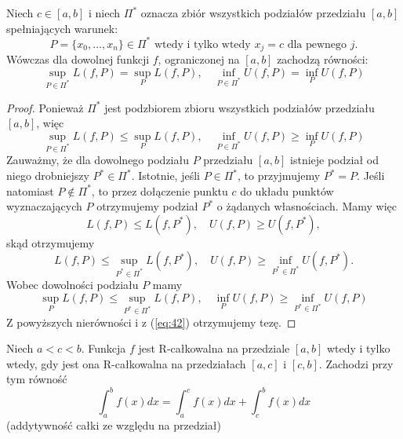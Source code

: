 \documentclass[leqno]{article}
\begin{document}
\begin{justify}
\begin{lemat}
{
    Niech $c \in [a,b]$ i niech $\Pi^*$ oznacza zbiór wszystkich podziałów przedziału $[a,b]$ spełniających warunek:
    \[
        P = \{x_0, \ldots, x_n\} \in \Pi^* \text{ wtedy i tylko wtedy $x_j = c$ dla pewnego $j$.} 
    \]
    Wówczas dla dowolnej funkcji $f$, ograniczonej na $[a,b]$ zachodzą równości:
    \[
        \sup_{P \in \Pi^*}L(f, P) = \sup_{P}L(f, P), \quad  \inf_{P \in \Pi^*}U(f, P) = \inf_{P}U(f, P)
    \]
}
\end{lemat}
\begin{proof}
    Ponieważ $\Pi^*$ jest podzbiorem zbioru wszystkich podziałów przedziału $[a,b]$, więc
    \begin{equation}\label{eq:42}
        \sup_{P \in \Pi^*}L(f, P) \leqslant \sup_{P}L(f, P), \quad  \inf_{P \in \Pi^*}U(f, P) \geqslant \inf_{P}U(f, P)
    \end{equation}
    Zauważmy, że dla dowolnego podziału $P$ przedziału $[a,b]$ istnieje podział od niego drobniejszy
    $P^* \in \Pi^*$. Istotnie, jeśli $P \in \Pi^*$, to przyjmujemy $P^* = P$. Jeśli natomiast $P \notin \Pi^*$,
    to przez dołączenie punktu $c$ do układu punktów wyznaczających $P$ otrzymujemy podział $P^*$ o żądanych własnościach.
    Mamy więc
    \[
        L(f, P) \leqslant L(f, P^*), \quad U(f, P) \geqslant U(f, P^*),
    \]
    skąd otrzymujemy
    \[
        L(f, P) \leqslant \sup_{P^* \in \Pi^*}L(f, P^*), \quad U(f, P) \geqslant \inf_{P^* \in \Pi^*}U(f, P^*).
    \]
    Wobec dowolności podziału $P$ mamy
    \[
        \sup_{P}L(f, P) \leqslant \sup_{P^* \in \Pi^*}L(f, P), \quad  \inf_{P}U(f, P) \geqslant \inf_{P^* \in \Pi^*}U(f, P)
    \]
    Z powyższych nierówności i z (\ref{eq:42}) otrzymujemy tezę.
\end{proof}

\begin{theorem}
{
    Niech $a < c < b$. Funkcja $f$ jest R-całkowalna na przedziale $[a,b]$ wtedy i tylko wtedy, gdy
    jest ona R-całkowalna na przedziałach $[a,c]$ i $[c,b]$. Zachodzi przy tym równość
    \[
        \int_{a}^{b}f(x)dx = \int_{a}^{c}f(x)dx + \int_{c}^{b}f(x)dx
    \]
    (addytywność całki ze względu na przedział)
}
\end{theorem}


\end{justify}
\end{document}
